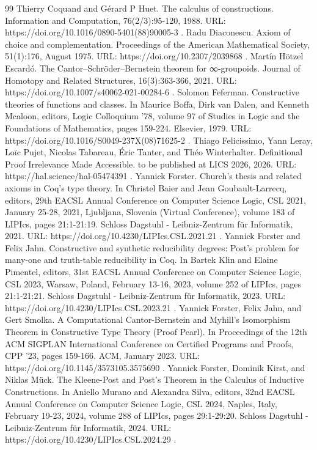 \documentclass[10pt,a4paper]{amsart}
\begin{document}
\begin{thebibliography}{99}
 Thierry Coquand and Gérard P Huet. The calculus of constructions. Information and Computation, 76(2/3):95-120, 1988. URL: https://doi.org/10.1016/0890-5401(88)90005-3 .
 Radu Diaconescu. Axiom of choice and complementation. Proceedings of the American Mathematical Society, 51(1):176, August 1975. URL: https://doi.org/10.2307/2039868 .
 Martín Hötzel Escardó. The Cantor–Schröder–Bernstein theorem for ∞-groupoids. Journal of Homotopy and Related Structures, 16(3):363-366, 2021. URL: https://doi.org/10.1007/s40062-021-00284-6 .
 Solomon Feferman. Constructive theories of functions and classes. In Maurice Boffa, Dirk van Dalen, and Kenneth Mcaloon, editors, Logic Colloquium '78, volume 97 of Studies in Logic and the Foundations of Mathematics, pages 159-224. Elsevier, 1979. URL: https://doi.org/10.1016/S0049-237X(08)71625-2 .
 Thiago Felicissimo, Yann Leray, Loïc Pujet, Nicolas Tabareau, Éric Tanter, and Théo Winterhalter. Definitional Proof Irrelevance Made Accessible. to be published at LICS 2026, 2026. URL: https://hal.science/hal-05474391 .
 Yannick Forster. Church’s thesis and related axioms in Coq’s type theory. In Christel Baier and Jean Goubault-Larrecq, editors, 29th EACSL Annual Conference on Computer Science Logic, CSL 2021, January 25-28, 2021, Ljubljana, Slovenia (Virtual Conference), volume 183 of LIPIcs, pages 21:1-21:19. Schloss Dagstuhl - Leibniz-Zentrum für Informatik, 2021. URL: https://doi.org/10.4230/LIPIcs.CSL.2021.21 .
 Yannick Forster and Felix Jahn. Constructive and synthetic reducibility degrees: Post’s problem for many-one and truth-table reducibility in Coq. In Bartek Klin and Elaine Pimentel, editors, 31st EACSL Annual Conference on Computer Science Logic, CSL 2023, Warsaw, Poland, February 13-16, 2023, volume 252 of LIPIcs, pages 21:1-21:21. Schloss Dagstuhl - Leibniz-Zentrum für Informatik, 2023. URL: https://doi.org/10.4230/LIPIcs.CSL.2023.21 .
 Yannick Forster, Felix Jahn, and Gert Smolka. A Computational Cantor-Bernstein and Myhill’s Isomorphism Theorem in Constructive Type Theory (Proof Pearl). In Proceedings of the 12th ACM SIGPLAN International Conference on Certified Programs and Proofs, CPP ’23, pages 159-166. ACM, January 2023. URL: https://doi.org/10.1145/3573105.3575690 .
 Yannick Forster, Dominik Kirst, and Niklas Mück. The Kleene-Post and Post’s Theorem in the Calculus of Inductive Constructions. In Aniello Murano and Alexandra Silva, editors, 32nd EACSL Annual Conference on Computer Science Logic, CSL 2024, Naples, Italy, February 19-23, 2024, volume 288 of LIPIcs, pages 29:1-29:20. Schloss Dagstuhl - Leibniz-Zentrum für Informatik, 2024. URL: https://doi.org/10.4230/LIPIcs.CSL.2024.29 .

\end{thebibliography}
\end{document}

